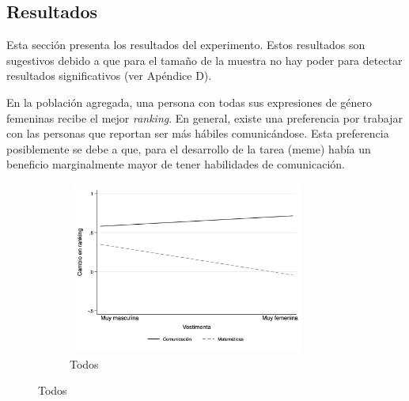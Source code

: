 \subsection{Resultados}
Esta sección presenta los resultados del experimento. Estos resultados son sugestivos debido a que para el tamaño de la muestra no hay poder para detectar resultados significativos (ver Apéndice D).

En la población agregada, una persona con todas sus expresiones de género femeninas recibe el mejor \textit{ranking}. En general, existe una preferencia por trabajar con las personas que reportan ser más hábiles comunicándose. Esta preferencia posiblemente se debe a que, para el desarrollo de la tarea (meme) había un beneficio marginalmente mayor de tener habilidades de comunicación. 

\begin{figure}[htbp]
    \centering
    \label{fig:hypothesis_graphs}
    \caption{Ranking esperado por combinación de expresiones de género}
    \begin{minipage}{0.245\textwidth}
        
    \end{minipage}
    \begin{subfigure}{0.49\textwidth}
        \centering
        \caption{Todos}
        \includegraphics[width=7.8cm]{Images/h1_predicted_rank_score.png}
    \end{subfigure}
    \begin{minipage}{0.245\textwidth}
        

\end{minipage}
\end{figure}
